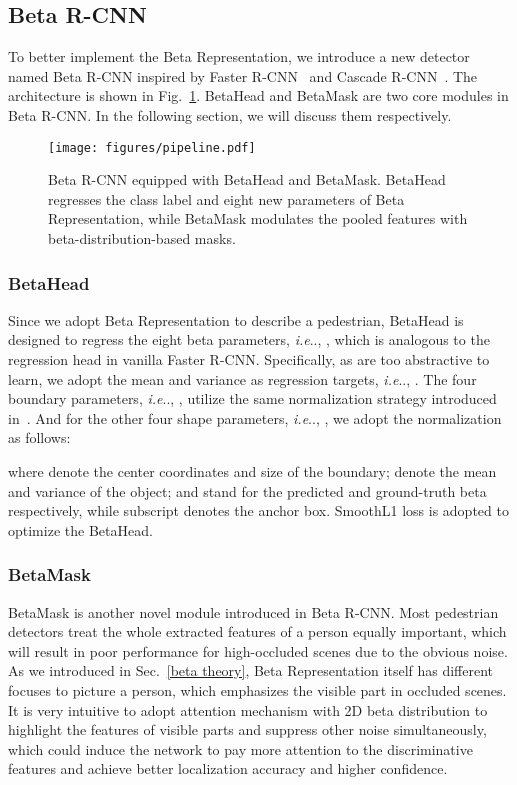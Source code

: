 \documentclass{article}
\makeatletter
\DeclareRobustCommand\onedot{\futurelet\@let@token\@onedot}
\def\@onedot{\ifx\@let@token.\else.\null\fi\xspace}
\def\ie{\emph{i.e}\onedot} \def\Ie{\emph{I.e}\onedot}
\makeatother
\begin{document}
\subsection{Beta R-CNN}
To better implement the Beta Representation, we introduce a new detector named Beta R-CNN inspired by Faster R-CNN~\cite{faster} and Cascade R-CNN~\cite{cascadercnn}. The architecture is shown in Fig.~\ref{BetaRCNN}. BetaHead and BetaMask are two core modules in Beta R-CNN.  In the following section, we will discuss them respectively.
\begin{figure}
    \centering
    \texttt{[image: figures/pipeline.pdf]}
    \caption{Beta R-CNN equipped with BetaHead and BetaMask. BetaHead regresses the class label and eight new parameters of Beta Representation, while BetaMask modulates the pooled features with beta-distribution-based masks.}
    \label{BetaRCNN}
\end{figure}

\subsubsection{BetaHead}
Since we adopt Beta Representation to describe a pedestrian, BetaHead is designed to regress the eight beta parameters, \ie, , which is analogous to the regression head in vanilla Faster R-CNN.
Specifically, as  are too abstractive to learn, we adopt the mean and variance as regression targets, \ie, .
The four boundary parameters, \ie, , utilize the same normalization strategy introduced in~\cite{faster}. 
And for the other four shape parameters, \ie, , we adopt the normalization as follows:

where  denote the center coordinates and size of the boundary;  denote the mean and variance of the object;
 and  stand for the predicted and ground-truth beta respectively, while subscript  denotes the anchor box.
SmoothL1 loss is adopted to optimize the BetaHead.

\subsubsection{BetaMask}
BetaMask is another novel module introduced in Beta R-CNN. 
Most pedestrian detectors treat the whole extracted features of a person equally important, which will result in poor performance for high-occluded scenes due to the obvious noise. 
As we introduced in Sec.~\ref{beta theory}, Beta Representation itself has different focuses to picture a person, which emphasizes the visible part in occluded scenes. It is very intuitive to adopt attention mechanism with 2D beta distribution to highlight the features of visible parts and suppress other noise simultaneously, which could induce the network to pay more attention to the discriminative features and achieve better localization accuracy and higher confidence.
\end{document}
